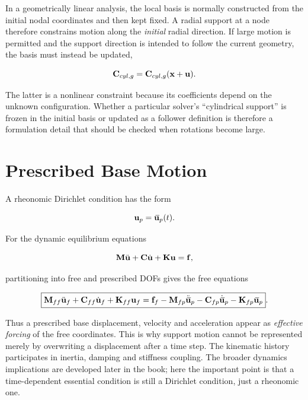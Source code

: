 In a geometrically linear analysis, the local basis is normally constructed
from the initial nodal coordinates and then kept fixed. A radial support at a
node therefore constrains motion along the \textit{initial} radial direction.
If large motion is permitted and the support direction is intended to follow
the current geometry, the basis must instead be updated,

\begin{equation}
    \mathbf{C}_{cyl,g}=\mathbf{C}_{cyl,g}(\mathbf{x}+\mathbf{u}).
\end{equation}

The latter is a nonlinear constraint because its coefficients depend on the
unknown configuration. Whether a particular solver's ``cylindrical support''
is frozen in the initial basis or updated as a follower definition is therefore
a formulation detail that should be checked when rotations become large.

\section{Prescribed Base Motion}

A rheonomic Dirichlet condition has the form

\begin{equation}
    \mathbf{u}_p={}\mkern3mu\overline{\mkern-3mu\mathbf{u}}_p(t).
\end{equation}

For the dynamic equilibrium equations

\begin{equation}
    \mathbf{M}\ddot{\mathbf{u}}
    +\mathbf{C}\dot{\mathbf{u}}
    +\mathbf{K}\mathbf{u}
    =\mathbf{f},
\end{equation}

partitioning into free and prescribed DOFs gives the free equations

\begin{equation}\label{eq:base-excitation-partition}
\boxed{
    \mathbf{M}_{ff}\ddot{\mathbf{u}}_f
    +\mathbf{C}_{ff}\dot{\mathbf{u}}_f
    +\mathbf{K}_{ff}\mathbf{u}_f
    =
    \mathbf{f}_f
    -\mathbf{M}_{fp}\ddot{{}\mkern3mu\overline{\mkern-3mu\mathbf{u}}}_p
    -\mathbf{C}_{fp}\dot{{}\mkern3mu\overline{\mkern-3mu\mathbf{u}}}_p
    -\mathbf{K}_{fp}{}\mkern3mu\overline{\mkern-3mu\mathbf{u}}_p
}.
\end{equation}

Thus a prescribed base displacement, velocity and acceleration appear as
\textit{effective forcing} of the free coordinates. This is why support motion
cannot be represented merely by overwriting a displacement after a time step.
The kinematic history participates in inertia, damping and stiffness coupling.
The broader dynamics implications are developed later in the book; here the
important point is that a time-dependent essential condition is still a
Dirichlet condition, just a rheonomic one.


